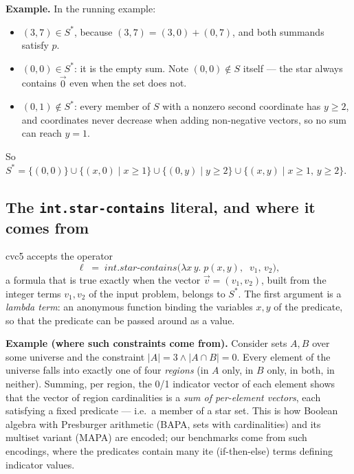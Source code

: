 \documentclass[11pt]{article}
\newcommand{\cvc}{\textsf{cvc5}\xspace}
\newcommand{\Sset}{\ensuremath{S}}
\newcommand{\Sstar}{\ensuremath{S^{*}}}
\newcommand{\vv}{\ensuremath{\vec{v}}\xspace}
\newcommand{\vzero}{\ensuremath{\vec{0}}\xspace}
\begin{document}
\begin{exbox}
\textbf{Example.} In the running example:
\begin{itemize}
\item $(3,7) \in \Sstar$, because $(3,7) = (3,0) + (0,7)$, and both
  summands satisfy $p$.
\item $(0,0) \in \Sstar$: it is the empty sum. Note $(0,0) \notin \Sset$
  itself --- the star always contains $\vzero$ even when the set does not.
\item $(0,1) \notin \Sstar$: every member of $\Sset$ with a nonzero second
  coordinate has $y \ge 2$, and coordinates never decrease when adding
  non-negative vectors, so no sum can reach $y = 1$.
\end{itemize}
So $\Sstar = \{(0,0)\} \cup \{(x,0) \mid x \ge 1\} \cup \{(0,y) \mid y \ge 2\}
\cup \{(x,y) \mid x \ge 1,\, y \ge 2\}$.
\end{exbox}

\subsection{The \texttt{int.star-contains} literal, and where it comes from}

\cvc accepts the operator
\[
\ell \;=\; \mathit{int.star\mbox{-}contains}\big(\lambda x\, y.\; p(x,y),\;\; v_1,\, v_2\big),
\]
a formula that is true exactly when the vector $\vv = (v_1,v_2)$, built
from the integer terms $v_1, v_2$ of the input problem, belongs to
$\Sstar$. The first argument is a \emph{lambda term}: an anonymous function
binding the variables $x,y$ of the predicate, so that the predicate can be
passed around as a value.

\begin{exbox}
\textbf{Example (where such constraints come from).} Consider sets $A, B$
over some universe and the constraint $|A| = 3 \wedge |A \cap B| = 0$.
Every element of the universe falls into exactly one of four \emph{regions}
(in $A$ only, in $B$ only, in both, in neither). Summing, per region, the
0/1 indicator vector of each element shows that the vector of region
cardinalities is a \emph{sum of per-element vectors}, each satisfying a
fixed predicate --- i.e.\ a member of a star set. This is how Boolean
algebra with Presburger arithmetic (BAPA, sets with cardinalities) and its
multiset variant (MAPA) are encoded; our benchmarks come from such
encodings, where the predicates contain many \textsf{ite} (if-then-else)
terms defining indicator values.
\end{exbox}
\end{document}
